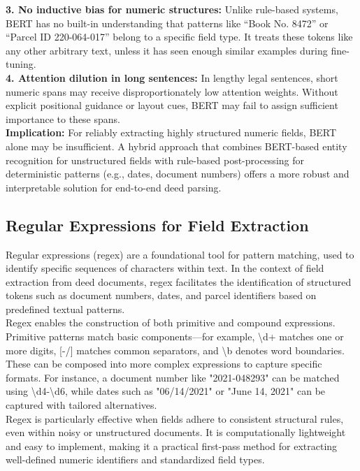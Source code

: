 \documentclass{article}
\begin{document}
\textbf{3. No inductive bias for numeric structures:} Unlike rule-based systems, BERT has no built-in understanding that patterns like ``Book No. 8472'' or ``Parcel ID 220-064-017'' belong to a specific field type. It treats these tokens like any other arbitrary text, unless it has seen enough similar examples during fine-tuning. \cite{wallace2019nlpnumber} \\

\textbf{4. Attention dilution in long sentences:} In lengthy legal sentences, short numeric spans may receive disproportionately low attention weights. Without explicit positional guidance or layout cues, BERT may fail to assign sufficient importance to these spans. \\

\textbf{Implication:} For reliably extracting highly structured numeric fields, BERT alone may be insufficient. A hybrid approach that combines BERT-based entity recognition for unstructured fields with rule-based post-processing for deterministic patterns (e.g., dates, document numbers) offers a more robust and interpretable solution for end-to-end deed parsing.

\subsection{Regular Expressions for Field Extraction}

Regular expressions (regex) are a foundational tool for pattern matching, used to identify specific sequences of characters within text. \cite{friedl2006regex} In the context of field extraction from deed documents, regex facilitates the identification of structured tokens such as document numbers, dates, and parcel identifiers based on predefined textual patterns. \\

Regex enables the construction of both primitive and compound expressions. Primitive patterns match basic components—for example, \textbackslash d+ matches one or more digits, [-/] matches common separators, and \textbackslash b denotes word boundaries. These can be composed into more complex expressions to capture specific formats. For instance, a document number like "2021-048293" can be matched using \textbackslash d{4}-\textbackslash d{6}, while dates such as "06/14/2021" or "June 14, 2021" can be captured with tailored alternatives. \\

Regex is particularly effective when fields adhere to consistent structural rules, even within noisy or unstructured documents. It is computationally lightweight and easy to implement, making it a practical first-pass method for extracting well-defined numeric identifiers and standardized field types. \\
\end{document}
